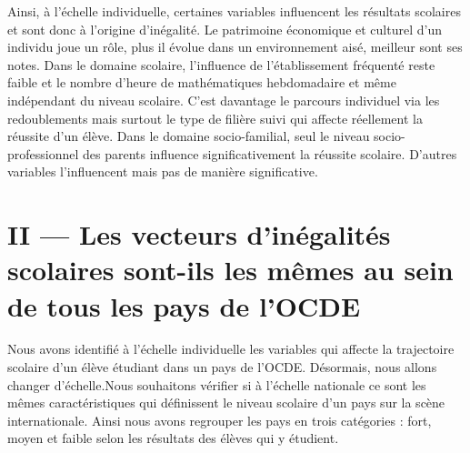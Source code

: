 \documentclass[
  french,
  11pt,
  a4paper,
]{report}
\begin{document}
Ainsi, à l'échelle individuelle, certaines variables influencent les
résultats scolaires et sont donc à l'origine d'inégalité. Le patrimoine
économique et culturel d'un individu joue un rôle, plus il évolue dans
un environnement aisé, meilleur sont ses notes. Dans le domaine
scolaire, l'influence de l'établissement fréquenté reste faible et le
nombre d'heure de mathématiques hebdomadaire et même indépendant du
niveau scolaire. C'est davantage le parcours individuel via les
redoublements mais surtout le type de filière suivi qui affecte
réellement la réussite d'un élève. Dans le domaine socio-familial, seul
le niveau socio-professionnel des parents influence significativement la
réussite scolaire. D'autres variables l'influencent mais pas de manière
significative.

\chapter{II --- Les vecteurs d'inégalités scolaires sont-ils les mêmes
au sein de tous les pays de
l'OCDE}\label{ii-les-vecteurs-dinuxe9galituxe9s-scolaires-sont-ils-les-muxeames-au-sein-de-tous-les-pays-de-locde}

Nous avons identifié à l'échelle individuelle les variables qui affecte
la trajectoire scolaire d'un élève étudiant dans un pays de l'OCDE.
Désormais, nous allons changer d'échelle.Nous souhaitons vérifier si à
l'échelle nationale ce sont les mêmes caractéristiques qui définissent
le niveau scolaire d'un pays sur la scène internationale. Ainsi nous
avons regrouper les pays en trois catégories : fort, moyen et faible
selon les résultats des élèves qui y étudient.

\begingroup\fontsize{8}{10}\selectfont
\end{document}
